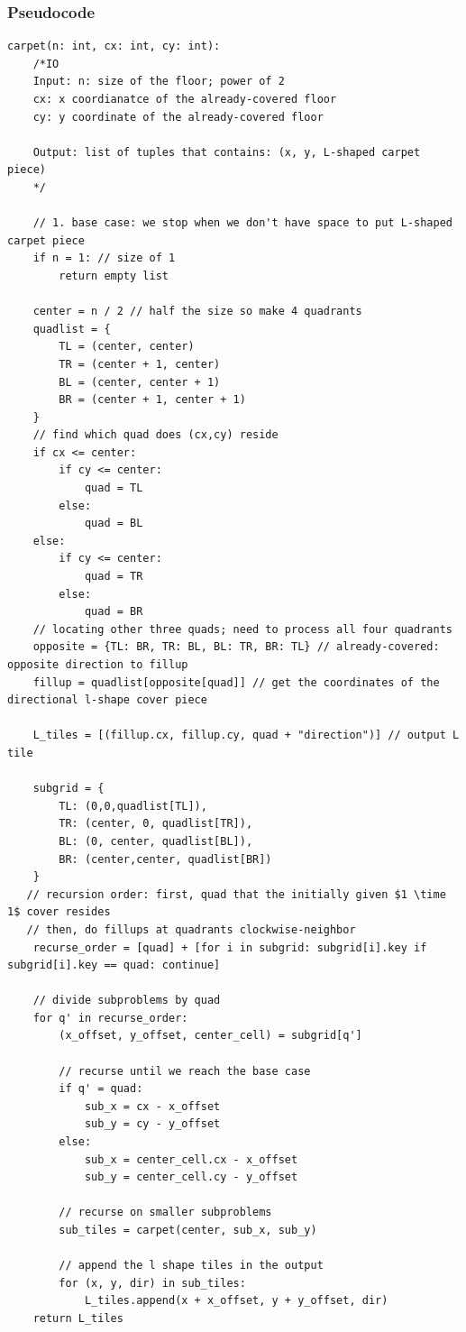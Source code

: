 \documentclass[11pt]{article}
\begin{document}
\hypertarget{pseudocode}{%
\subsubsection{Pseudocode}\label{pseudocode}}

\begin{verbatim}
carpet(n: int, cx: int, cy: int):
    /*IO
    Input: n: size of the floor; power of 2
    cx: x coordianatce of the already-covered floor
    cy: y coordinate of the already-covered floor

    Output: list of tuples that contains: (x, y, L-shaped carpet piece)
    */

    // 1. base case: we stop when we don't have space to put L-shaped carpet piece
    if n = 1: // size of 1
        return empty list

    center = n / 2 // half the size so make 4 quadrants
    quadlist = {
        TL = (center, center)
        TR = (center + 1, center)
        BL = (center, center + 1)
        BR = (center + 1, center + 1)
    }
    // find which quad does (cx,cy) reside
    if cx <= center:
        if cy <= center:
            quad = TL
        else:
            quad = BL
    else:
        if cy <= center:
            quad = TR
        else:
            quad = BR
    // locating other three quads; need to process all four quadrants
    opposite = {TL: BR, TR: BL, BL: TR, BR: TL} // already-covered: opposite direction to fillup
    fillup = quadlist[opposite[quad]] // get the coordinates of the directional l-shape cover piece

    L_tiles = [(fillup.cx, fillup.cy, quad + "direction")] // output L tile

    subgrid = {
        TL: (0,0,quadlist[TL]),
        TR: (center, 0, quadlist[TR]),
        BL: (0, center, quadlist[BL]),
        BR: (center,center, quadlist[BR])
    }
   // recursion order: first, quad that the initially given $1 \time 1$ cover resides
   // then, do fillups at quadrants clockwise-neighbor
    recurse_order = [quad] + [for i in subgrid: subgrid[i].key if subgrid[i].key == quad: continue]
    
    // divide subproblems by quad
    for q' in recurse_order:
        (x_offset, y_offset, center_cell) = subgrid[q']

        // recurse until we reach the base case
        if q' = quad:
            sub_x = cx - x_offset
            sub_y = cy - y_offset
        else:
            sub_x = center_cell.cx - x_offset
            sub_y = center_cell.cy - y_offset

        // recurse on smaller subproblems
        sub_tiles = carpet(center, sub_x, sub_y)

        // append the l shape tiles in the output
        for (x, y, dir) in sub_tiles:
            L_tiles.append(x + x_offset, y + y_offset, dir)
    return L_tiles
\end{verbatim}
\end{document}
